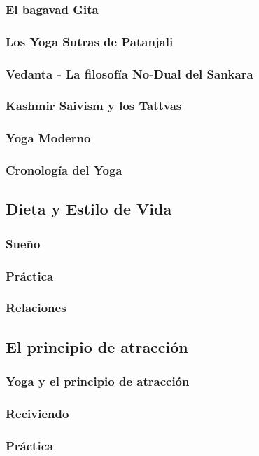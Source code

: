 \documentclass[a4paper]{article}
\begin{document}
\subsubsection{El bagavad Gita}
\subsubsection{Los Yoga Sutras de Patanjali}
\subsubsection{Vedanta - La filosof\'{i}a No-Dual del Sankara}
\subsubsection{Kashmir Saivism y los Tattvas}
\subsubsection{Yoga Moderno}
\subsubsection{Cronolog\'{i}a del Yoga}
\subsection{Dieta y Estilo de Vida}
\subsubsection{Sueño}
\subsubsection{Pr\'{a}ctica}
\subsubsection{Relaciones}
\subsection{El principio de atracci\'{o}n}
\subsubsection{Yoga y el principio de atracci\'{o}n}
\subsubsection{Reciviendo}
\subsubsection{Pr\'{a}ctica}
\end{document}
